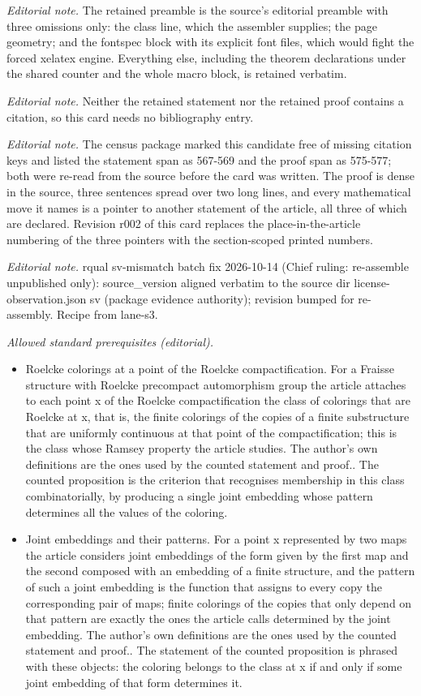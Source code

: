 \documentclass[10pt,a4paper]{article}
\theoremstyle{definition}
\numberwithin{equation}{section}
\numberwithin{figure}{section}
\numberwithin{table}{section}
\begin{document}
\noindent\textit{Editorial note.} The retained preamble is the source's editorial preamble with three omissions only: the class line, which the assembler supplies; the page geometry; and the fontspec block with its explicit font files, which would fight the forced xelatex engine. Everything else, including the theorem declarations under the shared counter and the whole macro block, is retained verbatim.\par\medskip
\noindent\textit{Editorial note.} Neither the retained statement nor the retained proof contains a citation, so this card needs no bibliography entry.\par\medskip
\noindent\textit{Editorial note.} The census package marked this candidate free of missing citation keys and listed the statement span as 567-569 and the proof span as 575-577; both were re-read from the source before the card was written. The proof is dense in the source, three sentences spread over two long lines, and every mathematical move it names is a pointer to another statement of the article, all three of which are declared. Revision r002 of this card replaces the place-in-the-article numbering of the three pointers with the section-scoped printed numbers.\par\medskip
\noindent\textit{Editorial note.} rqual sv-mismatch batch fix 2026-10-14 (Chief ruling: re-assemble unpublished only): source\_version aligned verbatim to the source dir license-observation.json sv (package evidence authority); revision bumped for re-assembly. Recipe from lane-s3.\par\medskip
\noindent\textit{Allowed standard prerequisites (editorial).}\begin{itemize}
\item Roelcke colorings at a point of the Roelcke compactification. For a Fraisse structure with Roelcke precompact automorphism group the article attaches to each point x of the Roelcke compactification the class of colorings that are Roelcke at x, that is, the finite colorings of the copies of a finite substructure that are uniformly continuous at that point of the compactification; this is the class whose Ramsey property the article studies. The author's own definitions are the ones used by the counted statement and proof.. The counted proposition is the criterion that recognises membership in this class combinatorially, by producing a single joint embedding whose pattern determines all the values of the coloring.
\item Joint embeddings and their patterns. For a point x represented by two maps the article considers joint embeddings of the form given by the first map and the second composed with an embedding of a finite structure, and the pattern of such a joint embedding is the function that assigns to every copy the corresponding pair of maps; finite colorings of the copies that only depend on that pattern are exactly the ones the article calls determined by the joint embedding. The author's own definitions are the ones used by the counted statement and proof.. The statement of the counted proposition is phrased with these objects: the coloring belongs to the class at x if and only if some joint embedding of that form determines it.
\end{itemize}\medskip
\end{document}
